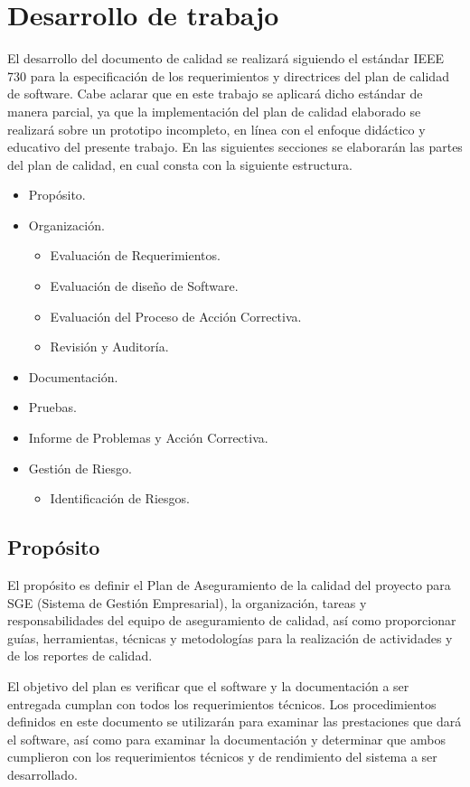 \documentclass[a4paper,10pt]{article}
\begin{document}
	\section{Desarrollo de trabajo}
	
	El desarrollo del documento de calidad se realizará siguiendo el estándar IEEE 730 \parencite{IEEE_Standards_Association} para la especificación de los requerimientos y directrices del plan de calidad de software. Cabe aclarar que en este trabajo se aplicará dicho estándar de manera parcial, ya que la implementación del plan de calidad elaborado se realizará sobre un prototipo incompleto, en línea con el enfoque didáctico y educativo del presente trabajo. En las siguientes secciones se elaborarán las partes del plan de calidad, en cual consta con la siguiente estructura.
	\begin{itemize}
		\item Propósito.
		\item Organización.
		\begin{itemize}
			\item Evaluación de Requerimientos.
			\item Evaluación de diseño de Software.
			\item Evaluación del Proceso de Acción Correctiva.
			\item Revisión y Auditoría.
		\end{itemize}
		\item Documentación.
		\item Pruebas.
		\item Informe de Problemas y Acción Correctiva.
		\item Gestión de Riesgo.
		\begin{itemize}
			\item Identificación de Riesgos.
		\end{itemize}
	\end{itemize}
	
	\subsection{Propósito}
	El propósito es definir el Plan de Aseguramiento de la calidad del proyecto para SGE (Sistema de Gestión Empresarial), la organización, tareas y responsabilidades del equipo de aseguramiento de calidad, así como proporcionar guías, herramientas, técnicas y metodologías para la realización de actividades y de los reportes de calidad. 
	
	El objetivo del plan es verificar que el software y la documentación a ser entregada cumplan con todos los requerimientos técnicos. Los procedimientos definidos en este documento se utilizarán para examinar las prestaciones que dará el software, así como para examinar la documentación y determinar que ambos cumplieron con los requerimientos técnicos y de rendimiento del sistema a ser desarrollado.
	
\end{document}
